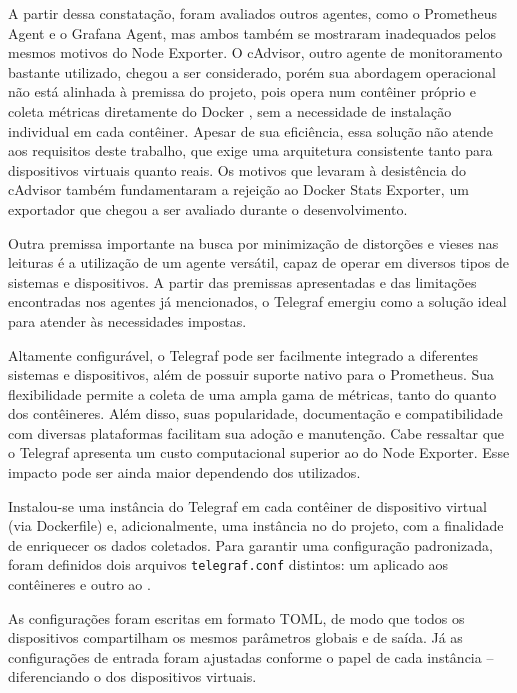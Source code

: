 A partir dessa constatação, foram avaliados outros agentes, como o Prometheus Agent e o Grafana Agent, mas ambos também se mostraram inadequados pelos mesmos motivos do Node Exporter. O cAdvisor, outro agente de monitoramento bastante utilizado, chegou a ser considerado, porém sua abordagem operacional não está alinhada à premissa do projeto, pois opera num contêiner próprio e coleta métricas diretamente do Docker , sem a necessidade de instalação individual em cada contêiner. Apesar de sua eficiência, essa solução não atende aos requisitos deste trabalho, que exige uma arquitetura consistente tanto para dispositivos virtuais quanto reais. Os motivos que levaram à desistência do cAdvisor também fundamentaram a rejeição ao Docker Stats Exporter, um exportador que chegou a ser avaliado durante o desenvolvimento.

Outra premissa importante na busca por minimização de distorções e vieses nas leituras é a utilização de um agente versátil, capaz de operar em diversos tipos de sistemas e dispositivos. A partir das premissas apresentadas e das limitações encontradas nos agentes já mencionados, o Telegraf emergiu como a solução ideal para atender às necessidades impostas.

Altamente configurável, o Telegraf pode ser facilmente integrado a diferentes sistemas e dispositivos, além de possuir suporte nativo para o Prometheus. Sua flexibilidade permite a coleta de uma ampla gama de métricas, tanto do  quanto dos contêineres. Além disso, suas popularidade, documentação e compatibilidade com diversas plataformas facilitam sua adoção e manutenção. Cabe ressaltar que o Telegraf apresenta um custo computacional superior ao do Node Exporter. Esse impacto pode ser ainda maior dependendo dos  utilizados.

Instalou-se uma instância do Telegraf em cada contêiner de dispositivo virtual (via Dockerfile) e, adicionalmente, uma instância no  do projeto, com a finalidade de enriquecer os dados coletados. Para garantir uma configuração padronizada, foram definidos dois arquivos \verb|telegraf.conf| distintos: um aplicado aos contêineres e outro ao .

As configurações foram escritas em formato TOML, de modo que todos os dispositivos compartilham os mesmos parâmetros globais e de saída. Já as configurações de entrada foram ajustadas conforme o papel de cada instância -- diferenciando o  dos dispositivos virtuais.

